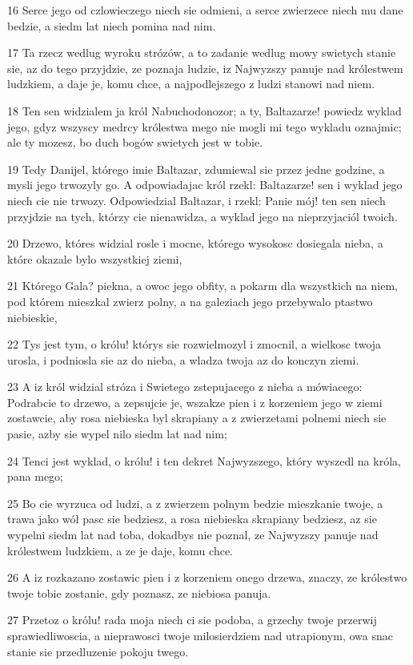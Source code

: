\par 16 Serce jego od czlowieczego niech sie odmieni, a serce zwierzece niech mu dane bedzie, a siedm lat niech pomina nad nim.
\par 17 Ta rzecz wedlug wyroku strózów, a to zadanie wedlug mowy swietych stanie sie, az do tego przyjdzie, ze poznaja ludzie, iz Najwyzszy panuje nad królestwem ludzkiem, a daje je, komu chce, a najpodlejszego z ludzi stanowi nad niem.
\par 18 Ten sen widzialem ja król Nabuchodonozor; a ty, Baltazarze! powiedz wyklad jego, gdyz wszyscy medrcy królestwa mego nie mogli mi tego wykladu oznajmic; ale ty mozesz, bo duch bogów swietych jest w tobie.
\par 19 Tedy Danijel, którego imie Baltazar, zdumiewal sie przez jedne godzine, a mysli jego trwozyly go. A odpowiadajac król rzekl: Baltazarze! sen i wyklad jego niech cie nie trwozy. Odpowiedzial Baltazar, i rzekl: Panie mój! ten sen niech przyjdzie na tych, którzy cie nienawidza, a wyklad jego na nieprzyjaciól twoich.
\par 20 Drzewo, któres widzial rosle i mocne, którego wysokosc dosiegala nieba, a które okazale bylo wszystkiej ziemi,
\par 21 Którego Gala? piekna, a owoc jego obfity, a pokarm dla wszystkich na niem, pod którem mieszkal zwierz polny, a na galeziach jego przebywalo ptastwo niebieskie,
\par 22 Tys jest tym, o królu! którys sie rozwielmozyl i zmocnil, a wielkosc twoja urosla, i podniosla sie az do nieba, a wladza twoja az do konczyn ziemi.
\par 23 A iz król widzial stróza i Swietego zstepujacego z nieba a mówiacego: Podrabcie to drzewo, a zepsujcie je, wszakze pien i z korzeniem jego w ziemi zostawcie, aby rosa niebieska byl skrapiany a z zwierzetami polnemi niech sie pasie, azby sie wypel nilo siedm lat nad nim;
\par 24 Tenci jest wyklad, o królu! i ten dekret Najwyzszego, który wyszedl na króla, pana mego;
\par 25 Bo cie wyrzuca od ludzi, a z zwierzem polnym bedzie mieszkanie twoje, a trawa jako wól pasc sie bedziesz, a rosa niebieska skrapiany bedziesz, az sie wypelni siedm lat nad toba, dokadbys nie poznal, ze Najwyzszy panuje nad królestwem ludzkiem, a ze je daje, komu chce.
\par 26 A iz rozkazano zostawic pien i z korzeniem onego drzewa, znaczy, ze królestwo twoje tobie zostanie, gdy poznasz, ze niebiosa panuja.
\par 27 Przetoz o królu! rada moja niech ci sie podoba, a grzechy twoje przerwij sprawiedliwoscia, a nieprawosci twoje milosierdziem nad utrapionym, owa snac stanie sie przedluzenie pokoju twego.
